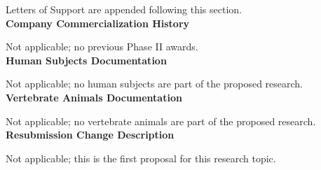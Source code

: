 \documentclass[11pt]{article}
\begin{document}
Letters of Support are appended following this section.  \\


{\bf \Large Company Commercialization History}

Not applicable; no previous Phase II awards.  \\


{\bf \Large Human Subjects Documentation}

Not applicable; no human subjects are part of the proposed research.  \\


{\bf \Large Vertebrate Animals Documentation}

Not applicable; no vertebrate animals are part of the proposed research.  \\


{\bf \Large Resubmission Change Description}

Not applicable; this is the first proposal for this research topic.  \\
\end{document}
